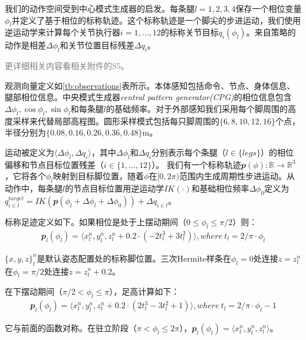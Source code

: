 我们的动作空间受到中心模式生成器的启发\cite[p]{Lee_Hwangbo_Wellhausen_Koltun_Hutter_2020}。每条腿$l={1,2,3,4}$保存一个相位变量$\phi_l$并定义了基于相位的标称轨迹。这个标称轨迹是一个脚尖的步进运动，我们使用逆运动学来计算每个关节执行器$i={1, \dots, 12}$的标称关节目标$q_i(\phi_l)$。来自策略的动作是相差$\Delta \phi_l$和关节位置目标残差$\Delta q_i$。

\textcolor{gray}{\small 更详细相关内容看相关附件的S5。}

观测向量定义如\ref{tb:observations}表所示。本体感知包括命令、节点、身体信息、腿部相位信息。中央模式生成器\emph{central pattern generator(CPG)}的相位信息包含$\Delta\phi_l, \cos\phi_l, \sin\phi_l$和每条腿$l$的基础频率。对于外部感知我们采用每个脚周围的高度采样来代替局部高程图。圆形采样模式包括每只脚周围的$\{6, 8, 10, 12, 16\}$个点，半径分别为$\{0.08, 0.16, 0.26, 0.36, 0.48\}$m。

运动被定义为$\langle \Delta \phi_l, \Delta q_i \rangle$，其中$\Delta \phi_l$和$\Delta q_i$分别表示每个条腿（$l\in\{legs\}$）的相位偏移和节点目标位置残差（$i\in \{1, \dots, 12\}$）。
我们有一个标称轨迹$\mathbfit{p}(\phi):\mathbb{R}\longrightarrow\mathbb{R}^3$，它将各个$\phi_l$映射到目标脚位置，随着$\phi$在$[0,2\pi)$范围内生成周期性步进运动。从动作中，每条腿$l$的节点目标位置用逆运动学$IK(\cdot)$和基础相位频率$\Delta\phi_0$定义为$q_{i\in l}^{target}=IK(\mathbfit{p}(\phi_l+\Delta \phi_l + \Delta \phi_0))+\Delta q_{i\in l}$。

标称足迹定义如下。如果相位是处于上摆动期间（$0\leq\phi_l\leq \pi/2$）则：
\begin{align}
  \mathbfit{p}_l(\phi_l)=\langle x_l^n, y_l^n, z_l^n + 0.2\cdot(-2t_l^3+3t_l^2)\rangle, where\ t_l=2/\pi\cdot\phi_l
\end{align}

$\{x,y,z\}_l^n$是默认姿态配置处的标称脚位置。三次Hermite样条在$\phi_l=0$处连接$z=z_l^n$在$\phi_l=\pi/2$处连接$z=z_l^n+0.2$。

在下摆动期间（$\pi/2 < \phi_l \leq \pi$），足高计算如下：
\begin{align}
  \mathbfit{p}_l(\phi_l)=\langle x_l^n, y_l^n, z_l^n + 0.2\cdot(2t_l^3-3t_l^2+1)\rangle, where\ t_l=2/\pi\cdot\phi_l-1
\end{align}

它与前面的函数对称。在驻立阶段（$\pi< \phi_l \leq 2\pi$），$\mathbfit{p}_l(\phi_l)=\langle x_l^n, y_l^n, z_l^n \rangle$。



